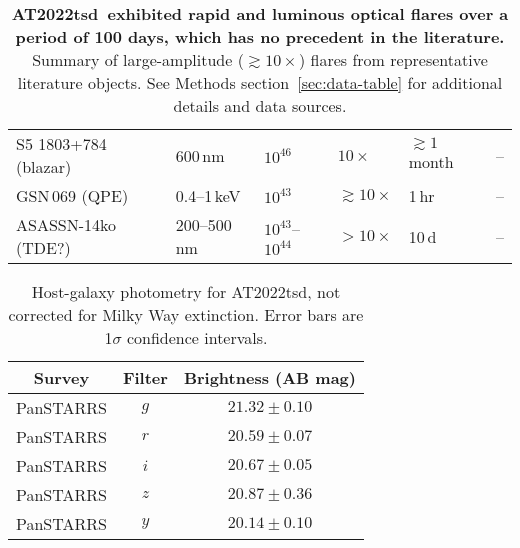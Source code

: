 \documentclass{nature_plusfigure}
\newcommand{\at}{AT2022tsd}
\begin{document}
\begin{supplement}
\begin{table}
\begin{tabular}{llllll}
    S5 1803+784 (blazar) & 600\,nm & $10^{46}$ & $10\times$ & $\gtrsim1\,$month & -- \\
    GSN\,069 (QPE) & 0.4--1\,keV & $10^{43}$ & $\gtrsim10\times$ & 1\,hr & -- \\
    ASASSN-14ko (TDE?) & 200--500\,nm & $10^{43}$--$10^{44}$ & $>10\times$ & 10\,d & -- \\
    \hline\hline
    \end{tabular}
    \caption{\textbf{\at\ exhibited rapid and luminous optical flares over a period of 100 days, which has no precedent in the literature.} Summary of large-amplitude ($\gtrsim10\times$) flares from representative literature objects. See Methods section~\ref{sec:data-table} for additional details and data sources.}
    \label{tab:flaring-classes}
\end{table}

\clearpage

%

\begin{table}
\begin{center}
\caption{Host-galaxy photometry for \at, not corrected for Milky Way extinction. Error bars are 1$\sigma$ confidence intervals.}
\label{tab:host-photometry}
\begin{tabular}{ccc} 
\hline\hline
Survey & Filter & Brightness (AB mag) \\
\hline
PanSTARRS & $g$               &$ 21.32 \pm 0.10 $\\
PanSTARRS & $r$               &$ 20.59 \pm 0.07 $\\
PanSTARRS & $i$               &$ 20.67 \pm 0.05 $\\
PanSTARRS & $z$               &$ 20.87 \pm 0.36 $\\
PanSTARRS & $y$               &$ 20.14 \pm 0.10 $\\
\hline
\end{tabular}
\end{center}
\end{table}


\end{supplement}
\end{document}
